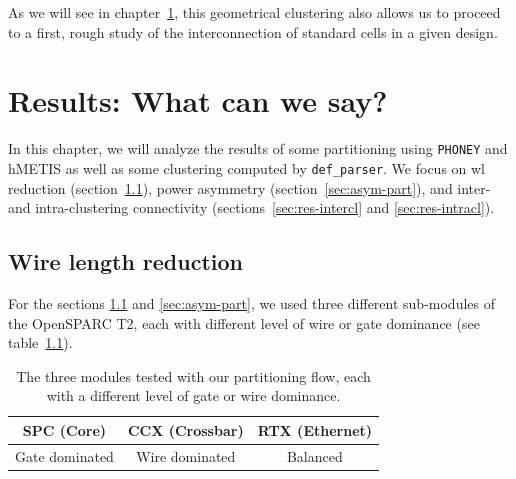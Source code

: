 \documentclass[11pt,a4paper]{report} %
\theoremstyle{customdef}
\begin{document}
As we will see in chapter~\ref{chap:results}, this geometrical clustering also allows us to proceed to a first, rough study of the interconnection of standard cells in a given design.








\chapter{Results: What can we say?}\label{chap:results}
In this chapter, we will analyze the results of some partitioning using \texttt{PHONEY} and hMETIS as well as some clustering computed by \texttt{def\_parser}.
We focus on \gls{wl} reduction (section~\ref{sec:wl}), power asymmetry (section~\ref{sec:asym-part}), and inter- and intra-clustering connectivity (sections~\ref{sec:res-intercl} and \ref{sec:res-intracl}).






\section{Wire length reduction}\label{sec:wl}

For the sections \ref{sec:wl} and \ref{sec:asym-part}, we used three different sub-modules of the OpenSPARC T2, each with different level of wire or gate dominance (see table~\ref{tab:arch}).

\begin{table}[!h]
	\centering
	\begin{tabular}{ccc}\hline
	SPC (Core) & CCX (Crossbar) & RTX (Ethernet) \\ \hline
	Gate dominated & Wire dominated & Balanced \\
	\end{tabular}
	\caption{The three modules tested with our partitioning flow, each with a different level of gate or wire dominance.}
	\label{tab:arch}
\end{table}
\end{document}
